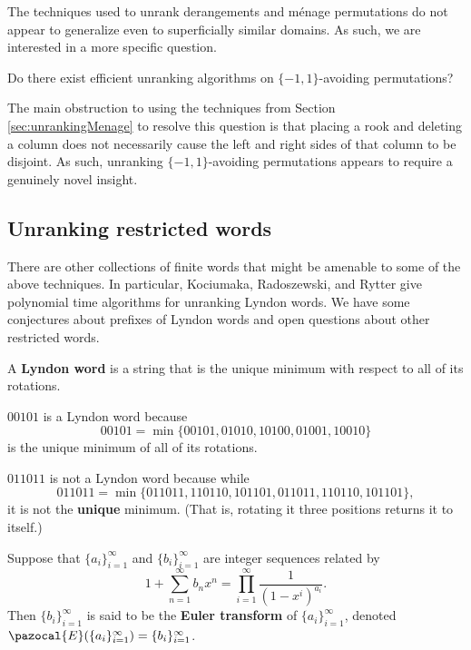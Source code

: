 The techniques used to unrank derangements and m\'enage permutations do
not appear to generalize even to superficially similar domains.
As such, we are interested in a more specific question.
\begin{openquestion}
  Do there exist efficient unranking algorithms on $\{-1, 1\}$-avoiding
  permutations?
\end{openquestion}

The main obstruction to using the techniques from
Section \ref{sec:unrankingMenage} to resolve this question is that placing
a rook and deleting a column does not necessarily cause the left and right
sides of that column to be disjoint. As such, unranking $\{-1,1\}$-avoiding
permutations appears to require a genuinely novel insight.

\subsection{Unranking restricted words}
There are other collections of finite words that might be amenable to some of
the above techniques. In particular, Kociumaka, Radoszewski, and Rytter
\cite{Kociumaka2014} give polynomial time algorithms for unranking Lyndon
words. We have some conjectures about prefixes of Lyndon words and open
questions about other restricted words.
\begin{definition}
  A \textbf{Lyndon word} is a string that is the unique minimum with respect
  to all of its rotations.
\end{definition}
\begin{example}
  $00101$ is a Lyndon word because \[
    00101 = \min\{00101, 01010, 10100, 01001, 10010\}
  \] is the unique minimum of all of its rotations.

  $011011$ is not a Lyndon word because while \[
    011011 = \min\{011011, 110110, 101101, 011011, 110110, 101101\},
  \]
  it is not the \textbf{unique} minimum.
  (That is, rotating it three positions returns it to itself.)
\end{example}

\begin{definition}
  Suppose that $\{a_i\}_{i=1}^\infty$ and $\{b_i\}_{i=1}^\infty$ are integer sequences
  related by \[
    1 + \sum_{n=1}^\infty b_n x^n = \prod_{i=1}^\infty \frac{1}{(1-x^i)^{a_i}}.
  \] Then $\{b_i\}_{i=1}^\infty$ is said to be the
  \textbf{Euler transform} of $\{a_i\}_{i=1}^\infty$, denoted
  $\pazocal{E}(\{a_i\}_{i=1}^\infty) = \{b_i\}_{i=1}^\infty$.
\end{definition}

